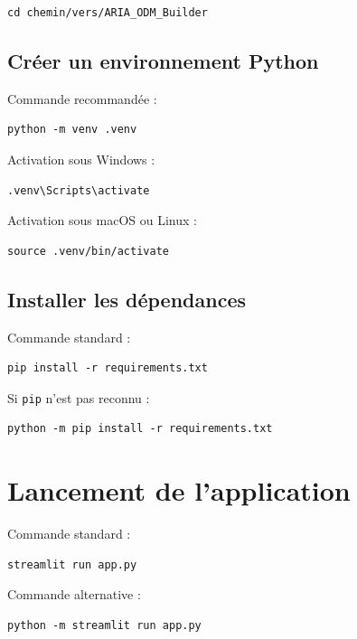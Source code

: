 \documentclass[11pt,a4paper]{article}
\newcommand{\code}[1]{\texttt{#1}}
\begin{document}
\begin{lstlisting}
cd chemin/vers/ARIA_ODM_Builder
\end{lstlisting}

\subsection{Créer un environnement Python}

Commande recommandée :

\begin{lstlisting}
python -m venv .venv
\end{lstlisting}

Activation sous Windows :

\begin{lstlisting}
.venv\Scripts\activate
\end{lstlisting}

Activation sous macOS ou Linux :

\begin{lstlisting}
source .venv/bin/activate
\end{lstlisting}

\subsection{Installer les dépendances}

Commande standard :

\begin{lstlisting}
pip install -r requirements.txt
\end{lstlisting}

Si \code{pip} n'est pas reconnu :

\begin{lstlisting}
python -m pip install -r requirements.txt
\end{lstlisting}

\section{Lancement de l'application}

Commande standard :

\begin{lstlisting}
streamlit run app.py
\end{lstlisting}

Commande alternative :

\begin{lstlisting}
python -m streamlit run app.py
\end{lstlisting}
\end{document}
